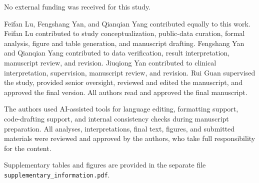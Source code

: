 \documentclass[referee,pdflatex,sn-basic,Numbered]{sn-jnl}
\begin{document}
No external funding was received for this study.


Feifan Lu, Fengshang Yan, and Qianqian Yang contributed equally to this work. Feifan Lu contributed to study conceptualization, public-data curation, formal analysis, figure and table generation, and manuscript drafting. Fengshang Yan and Qianqian Yang contributed to data verification, result interpretation, manuscript review, and revision. Jiuqiong Yan contributed to clinical interpretation, supervision, manuscript review, and revision. Rui Guan supervised the study, provided senior oversight, reviewed and edited the manuscript, and approved the final version. All authors read and approved the final manuscript.


The authors used AI-assisted tools for language editing, formatting support, code-drafting support, and internal consistency checks during manuscript preparation. All analyses, interpretations, final text, figures, and submitted materials were reviewed and approved by the authors, who take full responsibility for the content.

Supplementary tables and figures are provided in the separate file \texttt{supplementary\_information.pdf}.
\end{document}
